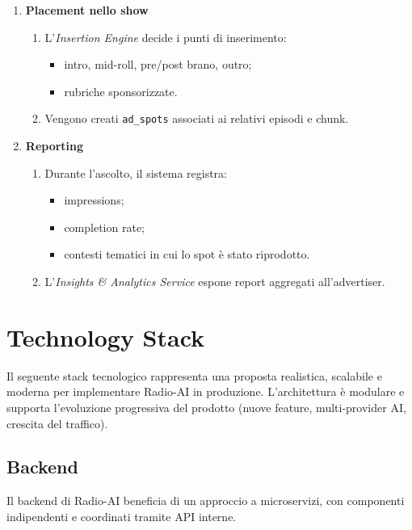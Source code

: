 \documentclass[11pt,a4paper]{article}
\begin{document}
\begin{enumerate}
    \item \textbf{Placement nello show}
    \begin{enumerate}
        \item L'\textit{Insertion Engine} decide i punti di inserimento:
        \begin{itemize}
            \item intro, mid-roll, pre/post brano, outro;
            \item rubriche sponsorizzate.
        \end{itemize}
        \item Vengono creati \texttt{ad\_spots} associati ai relativi episodi e chunk.
    \end{enumerate}

    \item \textbf{Reporting}
    \begin{enumerate}
        \item Durante l’ascolto, il sistema registra:
        \begin{itemize}
            \item impressions;
            \item completion rate;
            \item contesti tematici in cui lo spot è stato riprodotto.
        \end{itemize}
        \item L'\textit{Insights \& Analytics Service} espone report aggregati all'advertiser.
    \end{enumerate}
\end{enumerate}
\section{Technology Stack}

Il seguente stack tecnologico rappresenta una proposta realistica, scalabile e moderna per implementare Radio-AI in produzione.  
L’architettura è modulare e supporta l’evoluzione progressiva del prodotto (nuove feature, multi-provider AI, crescita del traffico).


\subsection{Backend}

Il backend di Radio-AI beneficia di un approccio a microservizi, con componenti indipendenti e coordinati tramite API interne.
\end{document}
